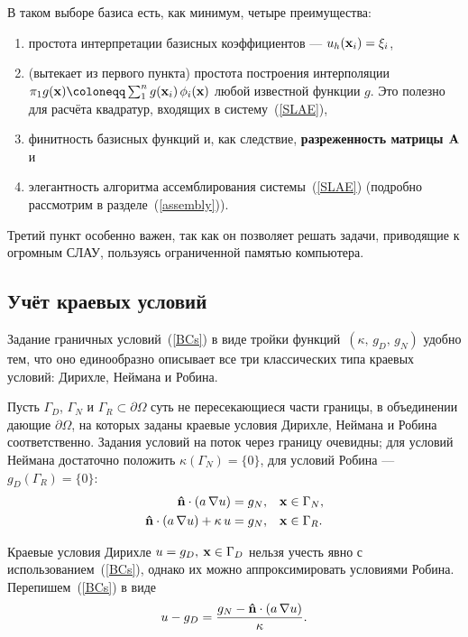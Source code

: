 В таком выборе базиса есть, как минимум, четыре преимущества:
\begin{enumerate}
	\item простота интерпретации базисных коэффициентов --- $u_h(\boldsymbol{\mathbf{x}}_i) = \xi_i$,
	\item (вытекает из первого пункта) простота построения интерполяции $\pi_1 g(\vect{x}) \coloneqq \sum_1^n g(\vect{x}_i) \, \phi_i(\vect{x})$ любой известной функции $g$. Это полезно для расчёта квадратур, входящих в систему~(\ref{SLAE}),
	\item финитность базисных функций и, как следствие, \textbf{разреженность матрицы $\boldsymbol{\mathbf{A}}$} и 
	\item элегантность алгоритма ассемблирования системы~(\ref{SLAE}) (подробно рассмотрим в разделе~(\ref{assembly})).
\end{enumerate} 

Третий пункт особенно важен, так как он позволяет решать задачи, приводящие к огромным СЛАУ, пользуясь ограниченной памятью компьютера.

\subsection{Учёт краевых условий}

Задание граничных условий~(\ref{BCs}) в виде тройки функций~$(\kappa, \, g_D, \, g_N)$ удобно тем, что оно единообразно описывает все три классических типа краевых условий: Дирихле, Неймана и Робина.

Пусть $\Gamma_D$, $\Gamma_N$ и $\Gamma_R \subset \partial \Omega$ суть не пересекающиеся части границы, в объединении дающие $\partial \Omega$, на которых заданы краевые условия Дирихле, Неймана и Робина соответственно. Задания условий на поток через границу очевидны; для условий Неймана достаточно положить $\kappa(\Gamma_N) = \{ 0 \}$, для условий Робина --- $g_D(\Gamma_R) = \{ 0 \}$:
\begin{align*}
\boldsymbol{\mathbf{\hat{n}}} \cdot (a \, \nabla u) = g_N,               &\quad \boldsymbol{\mathbf{x}} \in \Gamma_N, \\
\boldsymbol{\mathbf{\hat{n}}} \cdot (a \, \nabla u) + \kappa \, u = g_N, &\quad \boldsymbol{\mathbf{x}} \in \Gamma_R.
\end{align*}

Краевые условия Дирихле $u = g_D, \: \boldsymbol{\mathbf{x}} \in \Gamma_D$ нельзя учесть явно с использованием~(\ref{BCs}), однако их можно аппроксимировать условиями Робина. Перепишем~(\ref{BCs}) в виде
$$
u - g_D = \frac{ g_N - \boldsymbol{\mathbf{\hat{n}}} \cdot (a \, \nabla u) }{ \kappa }.
$$

